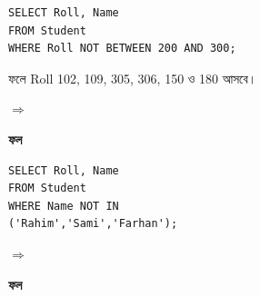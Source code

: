 \begin{minipage}{\linewidth}

\noindent\begin{minipage}[c]{.53\linewidth}
\begin{verbatim}
SELECT Roll, Name
FROM Student
WHERE Roll NOT BETWEEN 200 AND 300;
\end{verbatim}
\smallskip\small ফলে Roll 102, 109, 305, 306, 150 ও 180 আসবে।

\end{minipage}\hfill\begin{minipage}[c]{.04\linewidth}\raggedright{\color{chSixTeal}$\Rightarrow$}\end{minipage}\hfill
\begin{minipage}[c]{.40\linewidth}\raggedright\footnotesize\setlength{\tabcolsep}{2pt}\textbf{ফল}\par\smallskip
{}
\end{minipage}
\end{minipage}
\begin{minipage}{\linewidth}

\noindent\begin{minipage}[c]{.53\linewidth}
\begin{verbatim}
SELECT Roll, Name
FROM Student
WHERE Name NOT IN
('Rahim','Sami','Farhan');
\end{verbatim}
\end{minipage}\hfill\begin{minipage}[c]{.04\linewidth}\raggedright{\color{chSixTeal}$\Rightarrow$}\end{minipage}\hfill
\begin{minipage}[c]{.40\linewidth}\raggedright\footnotesize\setlength{\tabcolsep}{2pt}\textbf{ফল}\par\smallskip
{}
\end{minipage}
\end{minipage}
